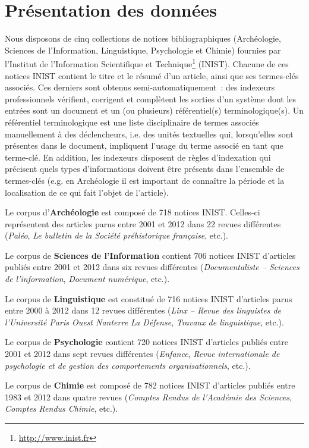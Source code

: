 \section{Présentation des données}
\label{sec:presentation_des_donnees}
  Nous disposons de cinq collections de notices bibliographiques (Archéologie,
  Sciences de l'Information, Linguistique, Psychologie et Chimie) fournies par
  l'Institut de l’Information Scientifique et
  Technique\footnote{\url{http://www.inist.fr}} (INIST). Chacune de ces notices
  INIST contient le titre et le résumé d'un article, ainsi que ses termes-clés
  associés. Ces derniers sont obtenus semi-automatiquement~: des indexeurs
  professionnels vérifient, corrigent et complètent les sorties d'un système
  dont les entrées sont un document et un (ou plusieurs) référentiel(s)
  terminologique(s). Un référentiel terminologique est une liste disciplinaire
  de termes associés manuellement à des déclencheurs, i.e. des unités textuelles
  qui, lorsqu'elles sont présentes dans le document, impliquent l'usage du terme
  associé en tant que terme-clé. En addition, les indexeurs disposent de règles
  d'indexation qui précisent quels types d'informations doivent être présents
  dans l'ensemble de termes-clés (e.g. en Archéologie il est important de
  connaître la période et la localisation de ce qui fait l'objet de l'article).

  Le corpus d'\textbf{Archéologie} est composé de 718 notices INIST. Celles-ci
  représentent des articles parus entre 2001 et 2012 dans 22 revues différentes
  (\textit{Paléo}, \textit{Le bulletin de la Société préhistorique française},
  etc.).

  Le corpus de \textbf{Sciences de l'Information} contient 706 notices INIST
  d'articles publiés entre 2001 et 2012 dans six revues différentes
  (\textit{Documentaliste -- Sciences de l'information}, \textit{Document
  numérique}, etc.).

  Le corpus de \textbf{Linguistique} est constitué de 716 notices INIST
  d'articles parus entre 2000 à 2012 dans 12 revues différentes
  (\textit{Linx -- Revue des linguistes de l'Université Paris Ouest Nanterre La
  Défense}, \textit{Travaux de linguistique}, etc.).

  Le corpus de \textbf{Psychologie} contient 720 notices INIST d'articles
  publiés entre 2001 et 2012 dans sept revues différentes
  (\textit{Enfance}, \textit{Revue internationale de psychologie et de gestion
  des comportements organisationnels}, etc.).

  Le corpus de \textbf{Chimie} est composé de 782 notices INIST d'articles
  publiés entre 1983 et 2012 dans quatre revues (\textit{Comptes Rendus de
  l'Académie des Sciences}, \textit{Comptes Rendus Chimie}, etc.).

